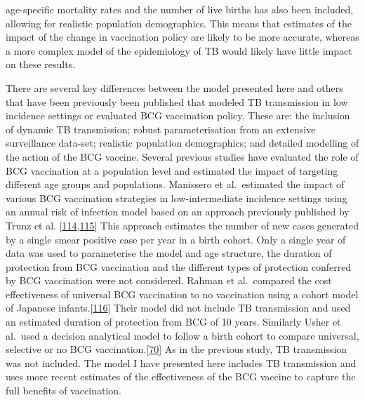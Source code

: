 \documentclass[11pt,twoside]{bristolthesis}
\begin{document}
age-specific mortality rates and the number of live births has also been included, allowing for realistic population demographics. This means that estimates of the impact of the change in vaccination policy are likely to be more accurate, whereas a more complex model of the epidemiology of TB would likely have little impact on these results.
  
  There are several key differences between the model presented here and others that have been previously been published that modeled TB transmission in low incidence settings or evaluated BCG vaccination policy. These are: the inclusion of dynamic TB transmission; robust parameterisation from an extensive surveillance data-set; realistic population demographics; and detailed modelling of the action of the BCG vaccine. Several previous studies have evaluated the role of BCG vaccination at a population level and estimated the impact of targeting different age groups and populations. Manissero et al.~estimated the impact of various BCG vaccination strategies in low-intermediate incidence settings using an annual risk of infection model based on an approach previously published by Trunz et al. {[}\protect\hyperlink{ref-Manissero2008a}{114},\protect\hyperlink{ref-Trunz2006}{115}{]} This approach estimates the number of new cases generated by a single smear positive case per year in a birth cohort. Only a single year of data was used to parameterise the model and age structure, the duration of protection from BCG vaccination and the different types of protection conferred by BCG vaccination were not considered. Rahman et al.~compared the cost effectiveness of universal BCG vaccination to no vaccination using a cohort model of Japanese infants.{[}\protect\hyperlink{ref-Rahman2001a}{116}{]} Their model did not include TB transmission and used an estimated duration of protection from BCG of 10 years. Similarly Usher et al.~used a decision analytical model to follow a birth cohort to compare universal, selective or no BCG vaccination.{[}\protect\hyperlink{ref-Usher2016}{70}{]} As in the previous study, TB transmission was not included. The model I have presented here includes TB transmission and uses more recent estimates of the effectiveness of the BCG vaccine to capture the full benefits of vaccination.
  
\end{document}
